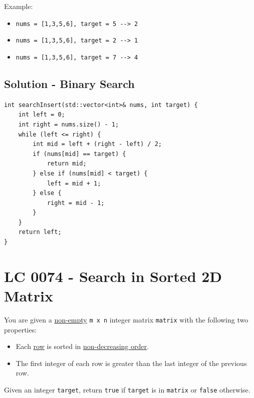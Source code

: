 Example:
\begin{itemize}
	\item {\colorbox{CodeBackground}{\lstinline|nums = [1,3,5,6], target = 5 --> 2|}}
	\item {\colorbox{CodeBackground}{\lstinline|nums = [1,3,5,6], target = 2 --> 1|}}
	\item {\colorbox{CodeBackground}{\lstinline|nums = [1,3,5,6], target = 7 --> 4|}}
\end{itemize}

\subsection*{Solution - Binary Search}
\begin{lstlisting}
int searchInsert(std::vector<int>& nums, int target) {
	int left = 0;
	int right = nums.size() - 1;
	while (left <= right) {
		int mid = left + (right - left) / 2;
		if (nums[mid] == target) {
			return mid;
		} else if (nums[mid] < target) {
			left = mid + 1;
		} else {
			right = mid - 1;
		}
	}
	return left;
}
\end{lstlisting}

\section{LC 0074 - Search in Sorted 2D Matrix}
You are given a \ul{non-empty} {\colorbox{CodeBackground}{\lstinline|m x n|}} integer matrix {\colorbox{CodeBackground}{\lstinline|matrix|}} with the following two properties:
\begin{itemize}
	\item Each \ul{row} is sorted in \ul{non-decreasing order}.
	\item The first integer of each row is greater than the last integer of the previous row.
\end{itemize}

Given an integer {\colorbox{CodeBackground}{\lstinline|target|}}, return {\colorbox{CodeBackground}{\lstinline|true|}} if {\colorbox{CodeBackground}{\lstinline|target|}} is in {\colorbox{CodeBackground}{\lstinline|matrix|}} or {\colorbox{CodeBackground}{\lstinline|false|}} otherwise. \\

